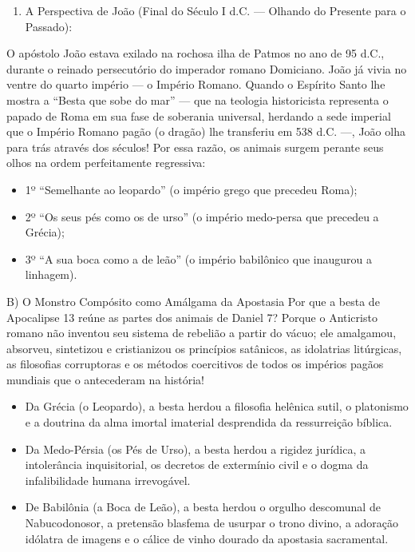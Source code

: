 \begin{enumerate}
  \item A Perspectiva de João (Final do Século I d.C. — Olhando do Presente para o Passado):
\end{enumerate}

O apóstolo João estava exilado na rochosa ilha de Patmos no ano de 95 d.C., durante o reinado persecutório do imperador romano Domiciano. João já vivia no ventre do quarto império — o Império Romano. Quando o Espírito Santo lhe mostra a ``Besta que sobe do mar'' — que na teologia historicista representa o papado de Roma em sua fase de soberania universal, herdando a sede imperial que o Império Romano pagão (o dragão) lhe transferiu em 538 d.C. —, João olha para trás através dos séculos!
Por essa razão, os animais surgem perante seus olhos na ordem perfeitamente regressiva:
\begin{itemize}
  \item 1º ``Semelhante ao leopardo'' (o império grego que precedeu Roma);
  \item 2º ``Os seus pés como os de urso'' (o império medo-persa que precedeu a Grécia);
  \item 3º ``A sua boca como a de leão'' (o império babilônico que inaugurou a linhagem).
\end{itemize}


B) O Monstro Compósito como Amálgama da Apostasia
Por que a besta de Apocalipse 13 reúne as partes dos animais de Daniel 7?
Porque o Anticristo romano não inventou seu sistema de rebelião a partir do vácuo; ele amalgamou, absorveu, sintetizou e cristianizou os princípios satânicos, as idolatrias litúrgicas, as filosofias corruptoras e os métodos coercitivos de todos os impérios pagãos mundiais que o antecederam na história!
\begin{itemize}
  \item Da Grécia (o Leopardo), a besta herdou a filosofia helênica sutil, o platonismo e a doutrina da alma imortal imaterial desprendida da ressurreição bíblica.
  \item Da Medo-Pérsia (os Pés de Urso), a besta herdou a rigidez jurídica, a intolerância inquisitorial, os decretos de extermínio civil e o dogma da infalibilidade humana irrevogável.
  \item De Babilônia (a Boca de Leão), a besta herdou o orgulho descomunal de Nabucodonosor, a pretensão blasfema de usurpar o trono divino, a adoração idólatra de imagens e o cálice de vinho dourado da apostasia sacramental.
\end{itemize}




